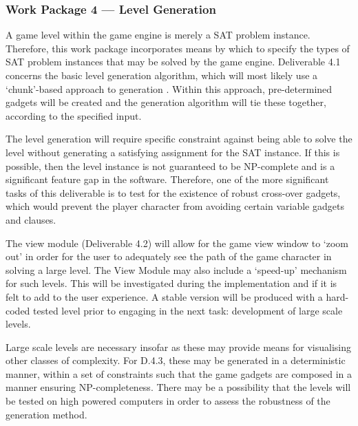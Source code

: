 \documentclass[a4paper]{article}
\begin{document}




\subsubsection{Work Package 4 --- Level Generation}

A game level within the game engine is merely a SAT problem instance. Therefore, this work package
incorporates means by which to specify the types of SAT problem instances that may be solved by the
game engine. Deliverable 4.1 concerns the basic level generation algorithm, which will most likely
use a `chunk'-based approach to generation \cite{mawhorter2010procedural}. Within this approach,
pre-determined gadgets will be created and the generation algorithm will tie these together,
according to the specified input.

The level generation will require specific constraint against being able to solve the level without
generating a satisfying assignment for the SAT instance. If this is possible, then the level
instance is not guaranteed to be NP-complete and is a significant feature gap in the software.
Therefore, one of the more significant tasks of this deliverable is to test for the existence of
robust cross-over gadgets, which would prevent the player character from avoiding certain variable
gadgets and clauses.

The view module (Deliverable 4.2) will allow for the game view window to `zoom out' in order for the
user to adequately see the path of the game character in solving a large level. The View Module may
also include a `speed-up' mechanism for such levels. This will be investigated during the
implementation and if it is felt to add to the user experience.  A stable version will be produced
with a hard-coded tested level prior to engaging in the next task: development of large scale
levels.

Large scale levels are necessary insofar as these may provide means for visualising other classes of
complexity. For D.4.3, these may be generated in a deterministic manner, within a set of constraints
such that the game gadgets are composed in a manner ensuring NP-completeness. There may be a
possibility that the levels will be tested on high powered computers in order to assess the
robustness of the generation method.
\end{document}

